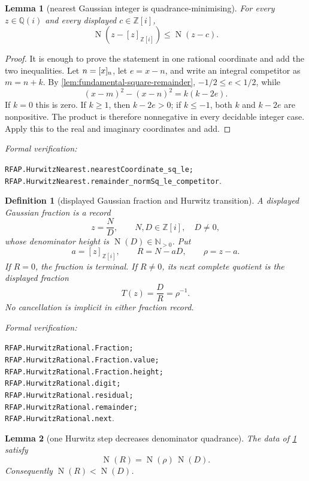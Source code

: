 \documentclass[11pt]{article}
\newtheorem{lemma}[lemma]{Lemma}
\newtheorem{definition}[definition]{Definition}
\newcommand{\Qi}{\mathbb{Q}(i)}
\newcommand{\Zi}{\mathbb{Z}[i]}
\newcommand{\N}{\mathbb{N}}
\newcommand{\Norm}[1]{\operatorname{N}\!\left(#1\right)}
\newcommand{\leanref}[1]{\par\smallskip\noindent
  \emph{Formal verification:}\par\nobreak
  {\raggedright\nolinkurl{#1}.\par}}
\begin{document}
\begin{lemma}[nearest Gaussian integer is quadrance-minimising]
\label{lem:nearest-minimises}
For every $z\in\Qi$ and every displayed $c\in\Zi$,
\begin{equation}
\label{eq:nearest-minimises}
                    \Norm{z-[z]_{\Zi}}\le\Norm{z-c}.
\end{equation}
\end{lemma}

\begin{proof}
It is enough to prove the statement in one rational coordinate and add the
two inequalities.  Let $n=[x]_{\rm n}$, let $e=x-n$, and write an integral
competitor as $m=n+k$.  By \cref{lem:fundamental-square-remainder},
$-1/2\le e<1/2$, while
\[
                     (x-m)^2-(x-n)^2=k(k-2e).
\]
If $k=0$ this is zero.  If $k\ge1$, then $k-2e>0$; if $k\le-1$, both $k$ and
$k-2e$ are nonpositive.  The product is therefore nonnegative in every
decidable integer case.  Apply this to the real and imaginary coordinates
and add.
\end{proof}

\leanref{RFAP.HurwitzNearest.nearestCoordinate_sq_le;
RFAP.HurwitzNearest.remainder_normSq_le_competitor}

\begin{definition}[displayed Gaussian fraction and Hurwitz transition]
\label{def:hurwitz-transition}
A displayed Gaussian fraction is a record
\[
                         z=\frac ND,
              \qquad N,D\in\Zi,\quad D\ne0,
\]
whose denominator height is $\Norm D\in\N_{>0}$.  Put
\begin{equation}
\label{eq:hurwitz-division}
 a=[z]_{\Zi},\qquad R=N-aD,
 \qquad \rho=z-a.
\end{equation}
If $R=0$, the fraction is terminal.  If $R\ne0$, its next complete quotient
is the displayed fraction
\begin{equation}
\label{eq:hurwitz-next}
                         T(z)=\frac D R=\rho^{-1}.
\end{equation}
No cancellation is implicit in either fraction record.
\end{definition}

\leanref{RFAP.HurwitzRational.Fraction;
RFAP.HurwitzRational.Fraction.value;
RFAP.HurwitzRational.Fraction.height;
RFAP.HurwitzRational.digit;
RFAP.HurwitzRational.residual;
RFAP.HurwitzRational.remainder;
RFAP.HurwitzRational.next}

\begin{lemma}[one Hurwitz step decreases denominator quadrance]
\label{lem:hurwitz-decrease}
The data of \cref{def:hurwitz-transition} satisfy
\begin{equation}
\label{eq:hurwitz-remainder-norm}
                 \Norm R=\Norm\rho\,\Norm D.
\end{equation}
Consequently $\Norm R<\Norm D$.
\end{lemma}
\end{document}
